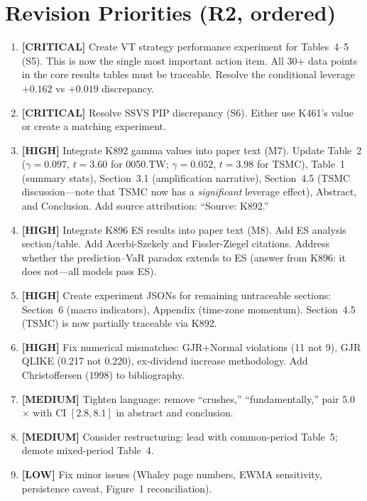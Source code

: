 \documentclass[12pt,a4paper]{article}
\begin{document}
\section*{Revision Priorities (R2, ordered)}

\begin{enumerate}

\item \textbf{[CRITICAL]} Create VT strategy performance experiment for Tables~4--5 (S5). This is now the single most important action item. All 30+ data points in the core results tables must be traceable. Resolve the conditional leverage $+0.162$ vs $+0.019$ discrepancy.

\item \textbf{[CRITICAL]} Resolve SSVS PIP discrepancy (S6). Either use K461's value or create a matching experiment.

\item \textbf{[HIGH]} Integrate K892 gamma values into paper text (M7). Update Table~2 ($\gamma = 0.097$, $t = 3.60$ for 0050.TW; $\gamma = 0.052$, $t = 3.98$ for TSMC), Table~1 (summary stats), Section~3.1 (amplification narrative), Section~4.5 (TSMC discussion---note that TSMC now has a \textit{significant} leverage effect), Abstract, and Conclusion. Add source attribution: ``Source: K892.''

\item \textbf{[HIGH]} Integrate K896 ES results into paper text (M8). Add ES analysis section/table. Add Acerbi-Szekely and Fissler-Ziegel citations. Address whether the prediction--VaR paradox extends to ES (answer from K896: it does not---all models pass ES).

\item \textbf{[HIGH]} Create experiment JSONs for remaining untraceable sections: Section~6 (macro indicators), Appendix (time-zone momentum). Section~4.5 (TSMC) is now partially traceable via K892.

\item \textbf{[HIGH]} Fix numerical mismatches: GJR+Normal violations (11 not 9), GJR QLIKE (0.217 not 0.220), ex-dividend increase methodology. Add Christoffersen (1998) to bibliography.

\item \textbf{[MEDIUM]} Tighten language: remove ``crushes,'' ``fundamentally,'' pair 5.0$\times$ with CI $[2.8, 8.1]$ in abstract and conclusion.

\item \textbf{[MEDIUM]} Consider restructuring: lead with common-period Table~5; demote mixed-period Table~4.

\item \textbf{[LOW]} Fix minor issues (Whaley page numbers, EWMA sensitivity, persistence caveat, Figure~1 reconciliation).

\end{enumerate}
\end{document}
